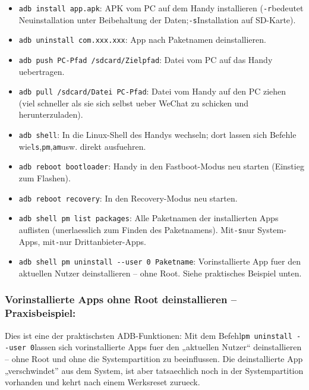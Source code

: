 \begin{itemize}
  \item \texttt{adb install app.\allowbreak apk}: APK vom PC auf dem Handy installieren (\texttt{-\allowbreak r}bedeutet Neuinstallation unter Beibehaltung der Daten;\texttt{-\allowbreak s}Installation auf SD-Karte).
  \item \texttt{adb uninstall com.\allowbreak xxx.\allowbreak xxx}: App nach Paketnamen deinstallieren.
  \item \texttt{adb push PC-\allowbreak Pfad /\allowbreak sdcard/\allowbreak Zielpfad}: Datei vom PC auf das Handy uebertragen.
  \item \texttt{adb pull /\allowbreak sdcard/\allowbreak Datei PC-\allowbreak Pfad}: Datei vom Handy auf den PC ziehen (viel schneller als sie sich selbst ueber WeChat zu schicken und herunterzuladen).
  \item \texttt{adb shell}: In die Linux-Shell des Handys wechseln; dort lassen sich Befehle wie\texttt{ls},\texttt{pm},\texttt{am}usw. direkt ausfuehren.
  \item \texttt{adb reboot bootloader}: Handy in den Fastboot-Modus neu starten (Einstieg zum Flashen).
  \item \texttt{adb reboot recovery}: In den Recovery-Modus neu starten.
  \item \texttt{adb shell pm list packages}: Alle Paketnamen der installierten Apps auflisten (unerlaesslich zum Finden des Paketnamens). Mit\texttt{-\allowbreak s}nur System-Apps, mit\texttt{-}nur Drittanbieter-Apps.
  \item \texttt{adb shell pm uninstall -\allowbreak -\allowbreak user 0 Paketname}: Vorinstallierte App fuer den aktuellen Nutzer deinstallieren – ohne Root. Siehe praktisches Beispiel unten.
\end{itemize}

\subsubsection*{Vorinstallierte Apps ohne Root deinstallieren – Praxisbeispiel:}

Dies ist eine der praktischsten ADB-Funktionen: Mit dem Befehl\texttt{pm uninstall -\allowbreak -\allowbreak user 0}lassen sich vorinstallierte Apps fuer den „aktuellen Nutzer“ deinstallieren – ohne Root und ohne die Systempartition zu beeinflussen. Die deinstallierte App „verschwindet” aus dem System, ist aber tatsaechlich noch in der Systempartition vorhanden und kehrt nach einem Werksreset zurueck.

